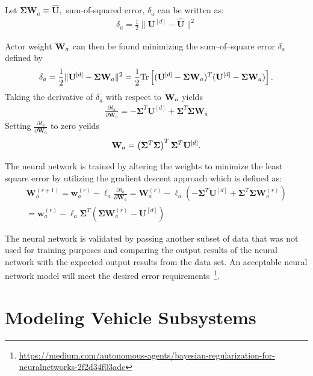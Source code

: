 \documentclass[journal,twoside,web]{ieeecolor}
\begin{document}
  Let $\bm{\Sigma}\mathbf{W}_a\equiv \hat{\mathbf{U}},$ sum-of-squared error, $\delta_a$ can be written as:
  \begin{align*}
    \delta_a = \frac{1}{2}\|\mathbf{U}^{[d]} - \hat{\mathbf{U}}\|^2
  \end{align*}

Actor weight ${\bf W}_a$ can then be found minimizing the sum--of--square error $\delta_a$ defined by %
%
\begin{align*}
  \delta_a = \frac{1}{2}\|{\bf U}^{[d]} - \bm{\Sigma} {\bf W}_a\|^2  = \frac{1}{2}\mathrm{Tr}\left[({\bf U}^{[d]} - \bm{\Sigma} {\bf W}_a)^T({\bf U}^{[d]} - \bm{\Sigma} {\bf W}_a)\right].
\end{align*}
%
Taking the derivative of $\delta_a$ with respect to ${\bf W}_a$ yields 
%
\begin{align}
  \frac{\partial\delta_a}{\partial\mathbf{W}_a} = - \bm{\Sigma}^T\mathbf{U}^{[d]} + \bm{\Sigma}^T \bm{\Sigma}\mathbf{W}_a
  \label{eq:actorWeightsGradient}
\end{align}
%
Setting $\frac{\partial\delta_a}{\partial\mathbf{W}_a}$ to zero yeilds
\begin{align*}
  {\bf W}_a = \left(\bm{\Sigma}^T\bm{\Sigma}\right)^T\bm{\Sigma}^T{\bf U}^{[d]}.
\end{align*}
 
 The neural network is trained by altering the weights to minimize the least square error by utilizing the gradient descent approach which is defined as:
 \begin{multline}
  \mathbf{W}_a^{(r+1)} = \mathbf{w}_a^{(r)} - \ell_a\frac{\partial\delta_a}{\partial\mathbf{W}_a}= \mathbf{W}_a^{(r)} - \ell_a\left(-\bm{\Sigma}^T\mathbf{U}^{[d]} + \bm{\Sigma}^T \bm{\Sigma}\mathbf{W}_a^{(r)}\right)\\
  = \mathbf{w}_a^{(r)}-\ell_a \bm{\Sigma}^T\left(\bm{\Sigma}\mathbf{W}_a^{(r)} - \mathbf{U}^{[d]}\right)
  \label{eq:actorWeightUpdate}
\end{multline}

 The neural network is validated by passing another subset of data that was not used for training purposes and comparing the output results of the neural network with the expected output results from the data set. An acceptable neural network model will meet the desired error requirements~\footnote{\url{https://medium.com/autonomous-agents/bayesian-regularization-for-neuralnetworks-2f2d34f03adc}}. 
 
 

\section{Modeling Vehicle Subsystems}
\end{document}
